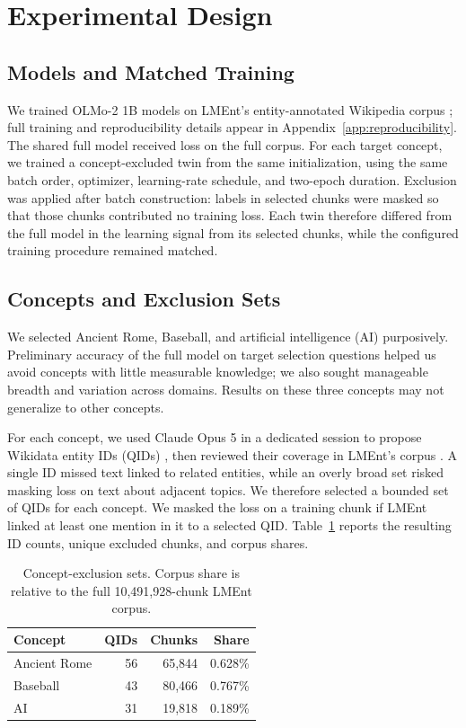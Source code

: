 \section{Experimental Design}
\label{sec:experimental-design}

\subsection{Models and Matched Training}

We trained OLMo-2 1B models on LMEnt's entity-annotated Wikipedia corpus
\citep{walsh2025olmo2,gottesman2025lment}; full training and reproducibility
details appear in Appendix~\ref{app:reproducibility}. The shared full model received
loss on the full corpus. For each target concept, we trained a
concept-excluded twin from the same initialization, using the same batch
order, optimizer, learning-rate schedule, and two-epoch duration. Exclusion
was applied after batch construction: labels in selected chunks were masked
so that those chunks contributed no training loss. Each twin therefore
differed from the full model in the learning signal from its selected
chunks, while the configured training procedure remained matched.

\subsection{Concepts and Exclusion Sets}

We selected Ancient Rome, Baseball, and artificial intelligence (AI)
purposively. Preliminary accuracy of the full model on target selection
questions helped us avoid concepts with little measurable knowledge; we also
sought manageable breadth and variation across domains. Results on these
three concepts may not generalize to other concepts.

For each concept, we used Claude Opus 5 in a dedicated session to propose
Wikidata entity IDs (QIDs) \citep{vrandecic2014wikidata}, then reviewed their
coverage in LMEnt's corpus \citep{gottesman2025lment}. A single ID missed text
linked to related entities, while an overly broad set risked masking loss on
text about adjacent topics. We therefore selected a bounded set of QIDs for
each concept. We masked the loss on a training chunk if LMEnt linked at
least one mention in it to a selected QID. Table~\ref{tab:exclusion-sets}
reports the resulting ID counts, unique excluded chunks, and corpus shares.

\begin{table}[b]
  \centering
  \small
  \begin{tabular}{lrrr}
    \toprule
    Concept & QIDs & Chunks & Share \\
    \midrule
    Ancient Rome & 56 & 65,844 & 0.628\% \\
    Baseball     & 43 & 80,466 & 0.767\% \\
    AI           & 31 & 19,818 & 0.189\% \\
    \bottomrule
  \end{tabular}
  \caption{Concept-exclusion sets. Corpus share is relative to the full
  10,491,928-chunk LMEnt corpus.}
  \label{tab:exclusion-sets}
\end{table}

